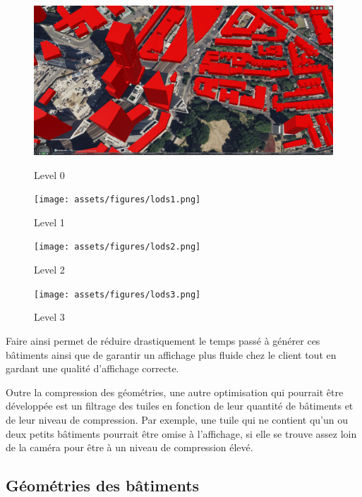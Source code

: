 \begin{figure}[H]
    \centering
    \begin{minipage}{0.49\textwidth}
        \centering
        \includegraphics[width=\textwidth]{assets/figures/lods0.png}
        \caption{Level 0}
        \label{fig:lods0}
    \end{minipage}\hfill
    \begin{minipage}{0.49\textwidth}
        \centering
        \texttt{[image: assets/figures/lods1.png]}
        \caption{Level 1}
        \label{fig:lods1}
    \end{minipage}
    \vspace{1cm}
    \begin{minipage}{0.49\textwidth}
        \centering
        \texttt{[image: assets/figures/lods2.png]}
        \caption{Level 2}
        \label{fig:lods2}
    \end{minipage}\hfill
    \begin{minipage}{0.49\textwidth}
        \centering
        \texttt{[image: assets/figures/lods3.png]}
        \caption{Level 3}
        \label{fig:lods3}
    \end{minipage}
\end{figure}


Faire ainsi permet de réduire drastiquement le temps passé à générer ces bâtiments ainsi que de garantir un affichage plus fluide chez le client tout en gardant une qualité d'affichage correcte.

Outre la compression des géométries, une autre optimisation qui pourrait être développée est un filtrage des tuiles en fonction de leur quantité de bâtiments et de leur niveau de compression. Par exemple, une tuile qui ne contient qu'un ou deux petits bâtiments pourrait être omise à l'affichage, si elle se trouve assez loin de la caméra pour être à un niveau de compression élevé.

\subsection{Géométries des bâtiments}

